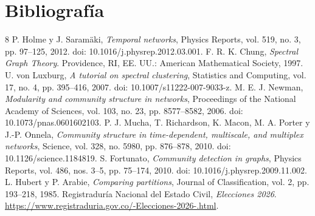 \documentclass[journal]{IEEEtran}
\begin{document}
\section{Bibliografía}
\begin{thebibliography}{8}
 P. Holme y J. Saramäki, \emph{Temporal networks}, Physics Reports, vol. 519, no. 3, pp. 97--125, 2012. doi: 10.1016/j.physrep.2012.03.001.
 F. R. K. Chung, \emph{Spectral Graph Theory}. Providence, RI, EE. UU.: American Mathematical Society, 1997.
 U. von Luxburg, \emph{A tutorial on spectral clustering}, Statistics and Computing, vol. 17, no. 4, pp. 395--416, 2007. doi: 10.1007/s11222-007-9033-z.
 M. E. J. Newman, \emph{Modularity and community structure in networks}, Proceedings of the National Academy of Sciences, vol. 103, no. 23, pp. 8577--8582, 2006. doi: 10.1073/pnas.0601602103.
 P. J. Mucha, T. Richardson, K. Macon, M. A. Porter y J.-P. Onnela, \emph{Community structure in time-dependent, multiscale, and multiplex networks}, Science, vol. 328, no. 5980, pp. 876--878, 2010. doi: 10.1126/science.1184819.
 S. Fortunato, \emph{Community detection in graphs}, Physics Reports, vol. 486, nos. 3--5, pp. 75--174, 2010. doi: 10.1016/j.physrep.2009.11.002.
 L. Hubert y P. Arabie, \emph{Comparing partitions}, Journal of Classification, vol. 2, pp. 193--218, 1985.
 Registraduría Nacional del Estado Civil, \emph{Elecciones 2026}. \url{https://www.registraduria.gov.co/-Elecciones-2026-.html}.
\end{thebibliography}
\end{document}
